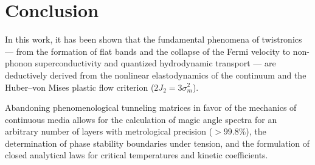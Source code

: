 \documentclass[12pt,a4paper]{article}
\begin{document}
\section{Conclusion}
												
In this work, it has been shown that the fundamental phenomena of twistronics — from the formation of flat bands and the collapse of the Fermi velocity to non-phonon superconductivity and quantized hydrodynamic transport — are deductively derived from the nonlinear elastodynamics of the continuum and the Huber--von Mises plastic flow criterion ($2J_2 = 3\sigma_m^2$). 
												
Abandoning phenomenological tunneling matrices in favor of the mechanics of continuous media allows for the calculation of magic angle spectra for an arbitrary number of layers with metrological precision ($> 99.8\%$), the determination of phase stability boundaries under tension, and the formulation of closed analytical laws for critical temperatures and kinetic coefficients.
												
\end{document}

